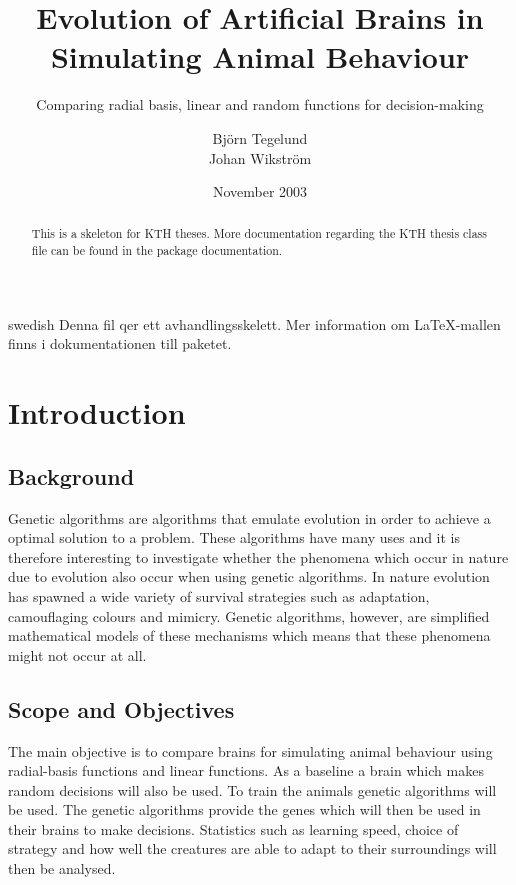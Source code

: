 \documentclass[a4paper,11pt]{kth-mag}
\title{Evolution of Artificial Brains in Simulating Animal Behaviour}
\subtitle{Comparing radial basis, linear and random functions for decision-making}
\author{Björn Tegelund\\Johan Wikström}
\date{November 2003}
\begin{document}
\frontmatter
\pagestyle{empty}
\removepagenumbers
\maketitle
{}
\begin{abstract}
  This is a skeleton for KTH theses. More documentation
  regarding the KTH thesis class file can be found in
  the package documentation.

\end{abstract}
\clearpage
\begin{foreignabstract}{swedish}
  Denna fil qer ett avhandlingsskelett.
  Mer information om \LaTeX-mallen finns i
  dokumentationen till paketet.

\end{foreignabstract}
\clearpage
\tableofcontents*
\mainmatter
\pagestyle{newchap}
\chapter{Introduction}

\section{Background}

Genetic algorithms are algorithms that emulate evolution in order to achieve a optimal solution to a problem. 
These algorithms have many uses and it is therefore interesting to investigate whether the phenomena which occur in nature due to evolution also occur when using genetic algorithms. In nature evolution has spawned a wide variety
of survival strategies such as adaptation, camouflaging colours and mimicry. Genetic algorithms, however, are 
 simplified mathematical models of these mechanisms which means that these phenomena might not occur 
at all.

\section{Scope and Objectives}

The main objective is to compare brains for simulating animal behaviour using radial-basis functions and linear functions. As a baseline a brain which makes random decisions will also be used. To train the animals genetic algorithms will be used. The genetic algorithms provide the genes which will then be used in their brains to make decisions. Statistics such as learning speed, choice of strategy and how well the creatures are able to adapt to their surroundings will then be analysed. 
\end{document}

